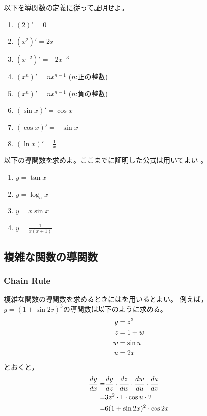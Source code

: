 \documentclass[twocolumn,11pt]{jarticle}
\begin{document}
\nquestion
以下を導関数の定義に従って証明せよ。
\begin{enumerate}
\item $(2)'=0$
\item $(x^2)'=2x$
\item $(x^{-2})'=-2x^{-3}$
\item $(x^n)'=nx^{n-1}$ ($n$:正の整数)
\item $(x^n)'=nx^{n-1}$ ($n$:負の整数)
\item $(\sin x)'=\cos x$
\item $(\cos x)'=-\sin x$
\item $\displaystyle (\ln x)'=\frac{1}{x}$
\end{enumerate}

\nquestion
以下の導関数を求めよ。ここまでに証明した公式は用いてよい
。
\begin{enumerate}
\item $y=\tan x$
\item $y=\log_a x$
\item $y=x\sin x$
\item $\displaystyle y=\frac{1}{x(x+1)}$
\end{enumerate}

\subsection{複雑な関数の導関数}

\subsubsection{Chain Rule}
複雑な関数の導関数を求めるときにはを用いるとよい。
例えば，$y=(1+\sin 2x)^3$の導関数は以下のように求める。
\begin{align}
  y&=z^3\notag\\
  z&=1+w\notag\\
  w&=\sin u\notag\\
  u&=2x\notag
\end{align}
とおくと，
\begin{align}
  \frac{dy}{dx}
  =&\frac{dy}{dz}\cdot\frac{dz}{dw}\cdot\frac{dw}{du}\cdot\frac{du}{dx}\notag\\
  =&3z^2\cdot 1 \cdot \cos u\cdot 2\notag\\
  =&6(1+\sin 2x)^2\cdot \cos 2x \notag
\end{align}
\end{document}
